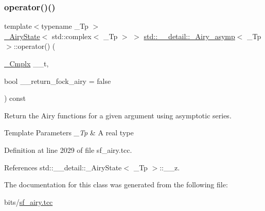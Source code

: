 \subsubsection{\texorpdfstring{operator()()}{operator()()}}
{\footnotesize\ttfamily template$<$typename \+\_\+\+Tp $>$ \\
\hyperlink{structstd_1_1____detail_1_1__AiryState}{\+\_\+\+Airy\+State}$<$ std\+::complex$<$ \+\_\+\+Tp $>$ $>$ \hyperlink{classstd_1_1____detail_1_1__Airy__asymp}{std\+::\+\_\+\+\_\+detail\+::\+\_\+\+Airy\+\_\+asymp}$<$ \+\_\+\+Tp $>$\+::operator() (\begin{DoxyParamCaption}\item[{\hyperlink{classstd_1_1____detail_1_1__Airy__asymp_ae28f102423d34e78502ab6da42d67f50}{\+\_\+\+Cmplx}}]{\+\_\+\+\_\+t,  }\item[{bool}]{\+\_\+\+\_\+return\+\_\+fock\+\_\+airy = {\ttfamily false} }\end{DoxyParamCaption}) const}

Return the Airy functions for a given argument using asymptotic series.


\begin{DoxyTemplParams}{Template Parameters}
{\em \+\_\+\+Tp} & A real type \\
\hline
\end{DoxyTemplParams}


Definition at line 2029 of file sf\+\_\+airy.\+tcc.



References std\+::\+\_\+\+\_\+detail\+::\+\_\+\+Airy\+State$<$ \+\_\+\+Tp $>$\+::\+\_\+\+\_\+z.



The documentation for this class was generated from the following file\+:\begin{DoxyCompactItemize}
\item 
bits/\hyperlink{sf__airy_8tcc}{sf\+\_\+airy.\+tcc}\end{DoxyCompactItemize}
